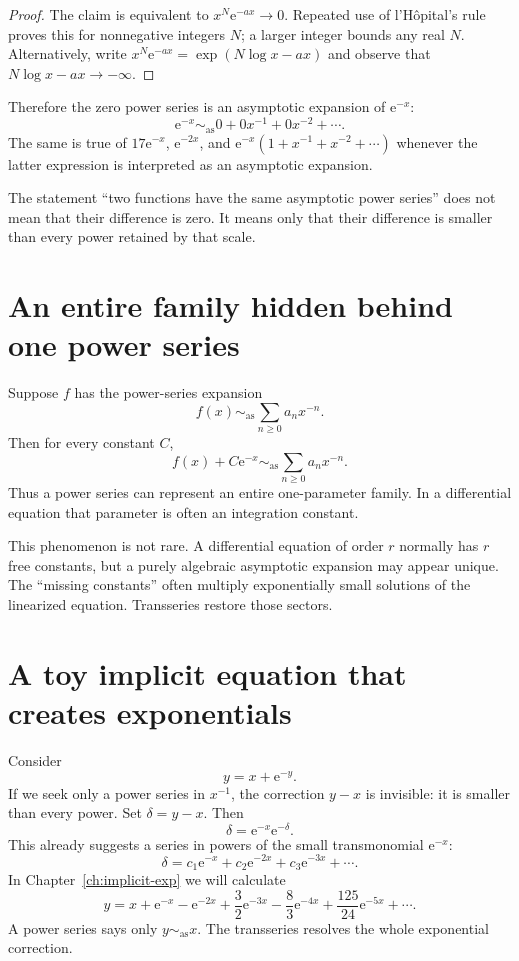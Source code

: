 \documentclass[11pt,oneside]{book}
\theoremstyle{definition}
\theoremstyle{remark}
\newcommand{\asympseries}{\sim_{\!\mathrm{as}}}
\newcommand{\e}{\mathrm{e}}
\begin{document}
\begin{proof}
The claim is equivalent to $x^N\e^{-ax}\to0$. Repeated use of l'H\^opital's
rule proves this for nonnegative integers $N$; a larger integer bounds any real
$N$. Alternatively, write $x^N\e^{-ax}=\exp(N\log x-ax)$ and observe that
$N\log x-ax\to-\infty$.
\end{proof}

Therefore the zero power series is an asymptotic expansion of $\e^{-x}$:
\[
  \e^{-x}\asympseries 0+0x^{-1}+0x^{-2}+\cdots.
\]
The same is true of $17\e^{-x}$, $\e^{-2x}$, and
$\e^{-x}(1+x^{-1}+x^{-2}+\cdots)$ whenever the latter expression is interpreted
as an asymptotic expansion.

\begin{warningbox}
The statement ``two functions have the same asymptotic power series'' does not
mean that their difference is zero. It means only that their difference is
smaller than every power retained by that scale.
\end{warningbox}

\section{An entire family hidden behind one power series}

Suppose $f$ has the power-series expansion
\[
  f(x)\asympseries\sum_{n\ge0}a_nx^{-n}.
\]
Then for every constant $C$,
\[
  f(x)+C\e^{-x}\asympseries\sum_{n\ge0}a_nx^{-n}.
\]
Thus a power series can represent an entire one-parameter family. In a
differential equation that parameter is often an integration constant.

This phenomenon is not rare. A differential equation of order $r$ normally has
$r$ free constants, but a purely algebraic asymptotic expansion may appear
unique. The ``missing constants'' often multiply exponentially small solutions
of the linearized equation. Transseries restore those sectors.

\section{A toy implicit equation that creates exponentials}

Consider
\begin{equation}
  y=x+\e^{-y}.
  \label{eq:toy-implicit}
\end{equation}
If we seek only a power series in $x^{-1}$, the correction $y-x$ is invisible:
it is smaller than every power. Set $\delta=y-x$. Then
\[
  \delta=\e^{-x}\e^{-\delta}.
\]
This already suggests a series in powers of the small transmonomial $\e^{-x}$:
\[
  \delta=c_1\e^{-x}+c_2\e^{-2x}+c_3\e^{-3x}+\cdots.
\]
In Chapter~\ref{ch:implicit-exp} we will calculate
\[
  y=x+\e^{-x}-\e^{-2x}+\frac32\e^{-3x}
     -\frac83\e^{-4x}+\frac{125}{24}\e^{-5x}+\cdots.
\]
A power series says only $y\asympseries x$. The transseries resolves the whole
exponential correction.
\end{document}
